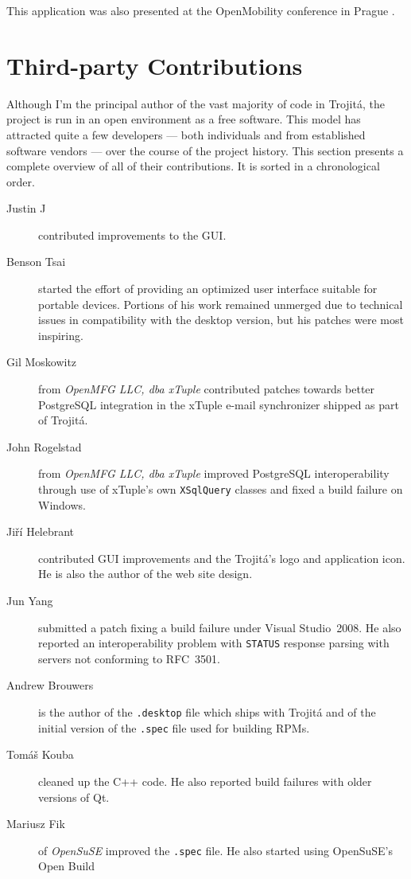 \documentclass[trojita]{subfiles}
\begin{document}
This application was also presented at the OpenMobility conference in Prague \cite{trojita-openmobility}.

\section{Third-party Contributions}

Although I'm the principal author of the vast majority of code in Trojitá, the project is run in an open environment as
a free software.  This model has attracted quite a few developers --- both individuals and from established software
vendors --- over the course of the project history.  This section presents a complete overview of all of their
contributions.  It is sorted in a chronological order.

\begin{description}
  \item[Justin J] contributed improvements to the GUI.
  \item[Benson Tsai] started the effort of providing an optimized user interface suitable for portable devices.
    Portions of his work remained unmerged due to technical issues in compatibility with the desktop version, but his
    patches were most inspiring.
  \item[Gil Moskowitz] from {\em OpenMFG LLC, dba xTuple} contributed patches towards better PostgreSQL integration in
    the xTuple e-mail synchronizer shipped as part of Trojitá.
  \item[John Rogelstad] from {\em OpenMFG LLC, dba xTuple} improved PostgreSQL interoperability through use of xTuple's
    own {\tt XSqlQuery} classes and fixed a build failure on Windows.
  \item[Jiří Helebrant] contributed GUI improvements and the Trojitá's logo and application icon.  He is also the author
    of the web site design.
  \item[Jun Yang] submitted a patch fixing a build failure under Visual Studio~2008.  He also reported an
    interoperability problem with {\tt STATUS} response parsing with servers not conforming to RFC~3501.
  \item[Andrew Brouwers] is the author of the {\tt .desktop} file which ships with Trojitá and of the initial version of
    the {\tt .spec} file used for building RPMs.
  \item[Tomáš Kouba] cleaned up the C++ code.  He also reported build failures with older versions of Qt.
  \item[Mariusz Fik] of {\em OpenSuSE} improved the {\tt .spec} file.  He also started using OpenSuSE's Open Build

\end{description}
\end{document}
